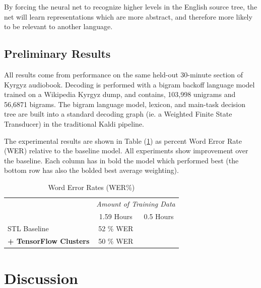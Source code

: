\documentclass[a4paper]{article}
\begin{document}
By forcing the neural net to recognize higher levels in the English source tree, the net will learn representations which are more abstract, and therefore more likely to be relevant to another language. 






\subsection{Preliminary Results}


All results come from performance on the same held-out 30-minute section of Kyrgyz audiobook. Decoding is performed with a bigram backoff language model trained on a Wikipedia Kyrgyz dump, and contains, 103,998 unigrams and 56,6871 bigrams. The bigram language model, lexicon, and main-task decision tree are built into a standard decoding graph (ie. a Weighted Finite State Transducer) in the traditional Kaldi pipeline. 

The experimental results are shown in Table (\ref{tab:results}) as percent Word Error Rate (WER) relative to the baseline model. All experiments show improvement over the baseline. Each column has in bold the model which performed best (the bottom row has also the bolded best average weighting).

\begin{table}[!htbp]
  \centering
  \caption{Word Error Rates (WER\%)}
    \label{tab:results}
  \begin{adjustbox}{width=.3\textwidth}
    \begin{tabular}{lcc}
      \toprule
      & \multicolumn{2}{c}{ \textit{Amount of Training Data}}\\
      & 1.59 Hours & 0.5 Hours \\
      \midrule
      STL Baseline                          & 52 \% WER      & \\
      \textbf{+ TensorFlow Clusters}        & 50 \% WER      &\\
      \midrule
      \bottomrule
    \end{tabular}
  \end{adjustbox}
\end{table}




\section{Discussion}
\end{document}
